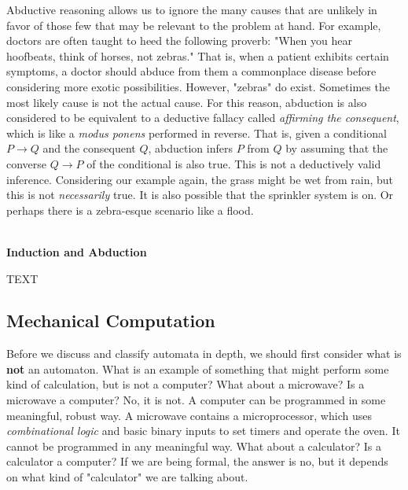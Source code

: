 Abductive reasoning allows us to ignore the many causes that are unlikely in favor of those few that may be relevant to the problem at hand. For example, doctors are often taught to heed the following proverb: "When you hear hoofbeats, think of horses, not zebras." That is, when a patient exhibits certain symptoms, a doctor should abduce from them a commonplace disease before considering more exotic possibilities. However, "zebras" do exist. Sometimes the most likely cause is not the actual cause. For this reason, abduction is also considered to be equivalent to a deductive fallacy called \textit{affirming the consequent}, which is like a \textit{modus ponens} performed in reverse. That is, given a conditional $P\rightarrow Q$ and the consequent $Q$, abduction infers $P$ from $Q$ by assuming that the converse $Q\rightarrow P$ of the conditional is also true. This is not a deductively valid inference. Considering our example again, the grass might be wet from rain, but this is not \textit{necessarily} true. It is also possible that the sprinkler system is on. Or perhaps there is a zebra-esque scenario like a flood. \\\\


\begin{tcolorbox}[breakable, enhanced, colback=textbook-blue, sharp corners]
	\vspace{3mm}
	\begin{center}
		\textbf{Induction and Abduction}
	\end{center}
	
	TEXT
	\vspace{3mm}
\end{tcolorbox}
\vspace{2\baselineskip}


\subsection{Mechanical Computation}


Before we discuss and classify automata in depth, we should first consider what is \textbf{not} an automaton. What is an example of something that might perform some kind of calculation, but is not a computer? What about a microwave? Is a microwave a computer? No, it is not. A computer can be programmed in some meaningful, robust way. A microwave contains a microprocessor, which uses \textit{combinational logic} and basic binary inputs to set timers and operate the oven. It cannot be programmed in any meaningful way. What about a calculator? Is a calculator a computer? If we are being formal, the answer is no, but it depends on what kind of "calculator" we are talking about. \\

